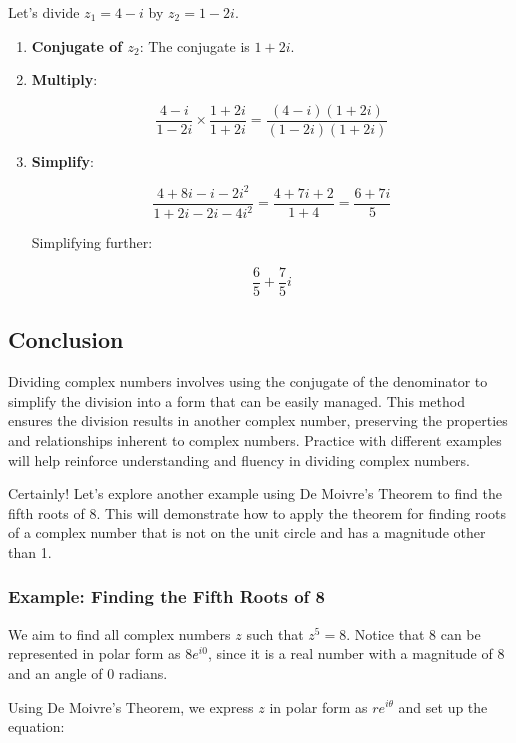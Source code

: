 \documentclass[
]{article}
\begin{document}
Let's divide \(z_1 = 4 - i\) by \(z_2 = 1 - 2i\).

\begin{enumerate}
\def\labelenumi{\arabic{enumi}.}
\item
  \textbf{Conjugate of \(z_2\)}: The conjugate is \(1 + 2i\).
\item
  \textbf{Multiply}:

  \[
  \frac{4 - i}{1 - 2i} \times \frac{1 + 2i}{1 + 2i} = \frac{(4 - i)(1 + 2i)}{(1 - 2i)(1 + 2i)}
  \]
\item
  \textbf{Simplify}:

  \[
  \frac{4 + 8i - i - 2i^2}{1 + 2i - 2i - 4i^2} = \frac{4 + 7i + 2}{1 + 4} = \frac{6 + 7i}{5}
  \]

  Simplifying further:

  \[
  \frac{6}{5} + \frac{7}{5}i
  \]
\end{enumerate}

\subsection{Conclusion}\label{conclusion-2}

Dividing complex numbers involves using the conjugate of the denominator
to simplify the division into a form that can be easily managed. This
method ensures the division results in another complex number,
preserving the properties and relationships inherent to complex numbers.
Practice with different examples will help reinforce understanding and
fluency in dividing complex numbers.

Certainly! Let's explore another example using De Moivre's Theorem to
find the fifth roots of \(8\). This will demonstrate how to apply the
theorem for finding roots of a complex number that is not on the unit
circle and has a magnitude other than 1.

\subsubsection{Example: Finding the Fifth Roots of
8}\label{example-finding-the-fifth-roots-of-8}

We aim to find all complex numbers \(z\) such that \(z^5 = 8\). Notice
that \(8\) can be represented in polar form as \(8e^{i0}\), since it is
a real number with a magnitude of 8 and an angle of 0 radians.

Using De Moivre's Theorem, we express \(z\) in polar form as
\(re^{i\theta}\) and set up the equation:
\end{document}
